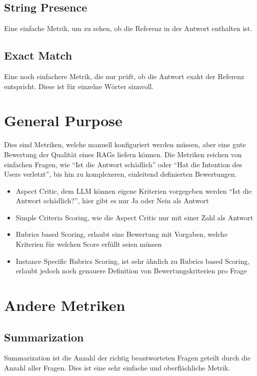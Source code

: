 \subsection{String Presence}
Eine einfache Metrik, um zu sehen, ob die Referenz in der Antwort enthalten ist.
\subsection{Exact Match}
Eine noch einfachere Metrik, die nur prüft, ob die Antwort exakt der Referenz entspricht. Diese ist für einzelne Wörter sinnvoll.

\section{General Purpose}
Dies sind Metriken, welche manuell konfiguriert werden müssen, aber eine gute Bewertung der Qualität eines RAGs liefern können.
Die Metriken reichen von einfachen Fragen, wie \enquote{Ist die Antwort schädlich} oder \enquote{Hat die Intention des Users verletzt}, bis hin zu komplexeren, einleitend definierten Bewertungen.
\begin{itemize}
    \item Aspect Critic, dem LLM können eigene Kriterien vorgegeben werden \enquote{Ist die Antwort schädlich?}, hier gibt es nur Ja oder Nein als Antwort
    \item Simple Criteria Scoring, wie die Aspect Critic nur mit einer Zahl als Antwort
    \item Rubrics based Scoring, erlaubt eine Bewertung mit Vorgaben, welche Kriterien für welchen Score erfüllt seien müssen
    \item Instance Specific Rubrics Scoring, ist sehr ähnlich zu Rubrics based Scoring, erlaubt jedoch noch genauere Definition von Bewertungskriterien pro Frage
\end{itemize}

\section{Andere Metriken}
\subsection{Summarization}
Summarization ist die Anzahl der richtig beantworteten Fragen geteilt durch die Anzahl aller Fragen. Dies ist eine sehr einfache und oberflächliche Metrik.
